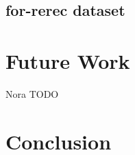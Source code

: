 \documentclass[sigconf,authordraft]{acmart}
\begin{document}
\subsection{for-rerec dataset}

\section{Future Work}
Nora TODO
\section{Conclusion}

\begin{acks}

\end{acks}



\end{document}

